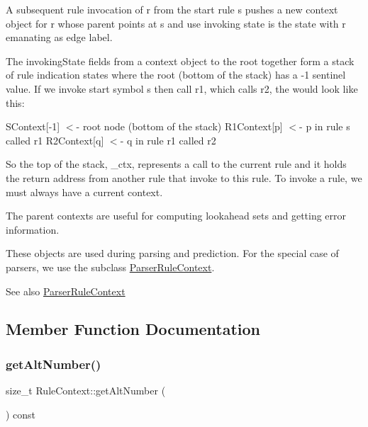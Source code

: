 A subsequent rule invocation of r from the start rule s pushes a new context object for r whose parent points at s and use invoking state is the state with r emanating as edge label.

The invoking\+State fields from a context object to the root together form a stack of rule indication states where the root (bottom of the stack) has a -\/1 sentinel value. If we invoke start symbol s then call r1, which calls r2, the would look like this\+:

S\+Context\mbox{[}-\/1\mbox{]} $<$-\/ root node (bottom of the stack) R1\+Context\mbox{[}p\mbox{]} $<$-\/ p in rule s called r1 R2\+Context\mbox{[}q\mbox{]} $<$-\/ q in rule r1 called r2

So the top of the stack, \+\_\+ctx, represents a call to the current rule and it holds the return address from another rule that invoke to this rule. To invoke a rule, we must always have a current context.

The parent contexts are useful for computing lookahead sets and getting error information.

These objects are used during parsing and prediction. For the special case of parsers, we use the subclass \hyperlink{classantlr4_1_1ParserRuleContext}{Parser\+Rule\+Context}.

\begin{DoxySeeAlso}{See also}
\hyperlink{classantlr4_1_1ParserRuleContext}{Parser\+Rule\+Context} 
\end{DoxySeeAlso}


\subsection{Member Function Documentation}
\mbox{\label{classantlr4_1_1RuleContext_abb31efff7ed16c524298b9052c75e8f7}} 
\subsubsection{\texorpdfstring{get\+Alt\+Number()}{getAltNumber()}}
{\footnotesize\ttfamily size\+\_\+t Rule\+Context\+::get\+Alt\+Number (\begin{DoxyParamCaption}{ }\end{DoxyParamCaption}) const\hspace{0.3cm}{\ttfamily [virtual]}}

